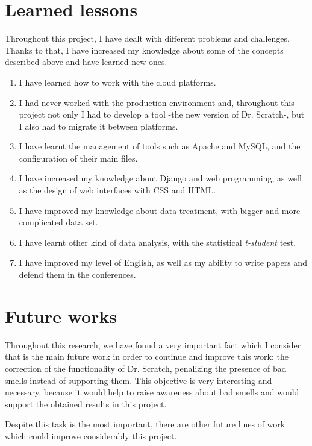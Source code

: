 \section{Learned lessons}
\label{sec:learned_lessons}

Throughout this project, I have dealt with different problems and challenges. Thanks to that, I have increased my knowledge about some of the concepts described above and have learned new ones.  

\begin{enumerate}
  \item I have learned how to work with the cloud platforms. 
  \item I had never worked with the production environment and, throughout this project not only I had to develop a tool -the new version of Dr. Scratch-, but I also had to migrate it between platforms.
  \item I have learnt the management of tools such as Apache and MySQL, and the configuration of their main files.
  \item I have increased my knowledge about Django and web programming, as well as the design of web interfaces with CSS and HTML.
  \item I have improved my knowledge about data treatment, with bigger and more complicated data set.
  \item I have learnt other kind of data analysis, with the statistical \textit{t-student} test.
  \item I have improved my level of English, as well as my ability to write papers and defend them in the conferences. 
\end{enumerate}


\section{Future works}
\label{sec:future_works}

Throughout this research, we have found a very important fact which I consider that is the main future work in order to continue and improve this work: the correction of the functionality of Dr. Scratch, penalizing the presence of bad smells instead of supporting them. This objective is very interesting and necessary, because it would help to raise awareness about bad smells and would support the obtained results in this project.

Despite this task is the most important, there are other future lines of work which could improve considerably this project.

